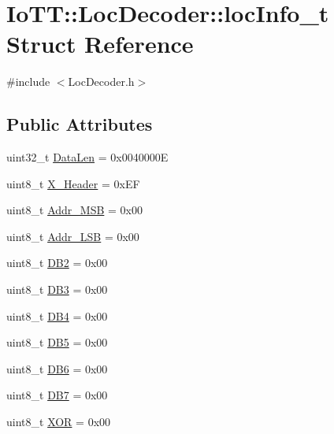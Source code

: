 \hypertarget{structIoTT_1_1LocDecoder_1_1locInfo__t}{}\section{Io\+TT\+:\+:Loc\+Decoder\+:\+:loc\+Info\+\_\+t Struct Reference}
\label{structIoTT_1_1LocDecoder_1_1locInfo__t}


{\ttfamily \#include $<$Loc\+Decoder.\+h$>$}

\subsection*{Public Attributes}
\begin{DoxyCompactItemize}
\item 
uint32\+\_\+t \hyperlink{structIoTT_1_1LocDecoder_1_1locInfo__t_a366f3daff17bd4cb0cb458fda712cb64}{Data\+Len} = 0x0040000E
\item 
uint8\+\_\+t \hyperlink{structIoTT_1_1LocDecoder_1_1locInfo__t_aa78eebe97913b8aee31970a397d1a2ea}{X\+\_\+\+Header} = 0x\+EF
\item 
uint8\+\_\+t \hyperlink{structIoTT_1_1LocDecoder_1_1locInfo__t_a1c7419ff7e49e06d643a6f2aee7094d1}{Addr\+\_\+\+M\+SB} = 0x00
\item 
uint8\+\_\+t \hyperlink{structIoTT_1_1LocDecoder_1_1locInfo__t_abac342575730426e02563ae3a3ba3e3d}{Addr\+\_\+\+L\+SB} = 0x00
\item 
uint8\+\_\+t \hyperlink{structIoTT_1_1LocDecoder_1_1locInfo__t_aa43dab417ff4feeaa85f4ef38d35f888}{D\+B2} = 0x00
\item 
uint8\+\_\+t \hyperlink{structIoTT_1_1LocDecoder_1_1locInfo__t_a66a7279b1e223bf966139127debdb7ee}{D\+B3} = 0x00
\item 
uint8\+\_\+t \hyperlink{structIoTT_1_1LocDecoder_1_1locInfo__t_ab6ae0249645f406dbe74c90055134b94}{D\+B4} = 0x00
\item 
uint8\+\_\+t \hyperlink{structIoTT_1_1LocDecoder_1_1locInfo__t_a6dcc29e90e186cdf681454bca48a4a59}{D\+B5} = 0x00
\item 
uint8\+\_\+t \hyperlink{structIoTT_1_1LocDecoder_1_1locInfo__t_a500934dde326dc7cd5a083cce1909356}{D\+B6} = 0x00
\item 
uint8\+\_\+t \hyperlink{structIoTT_1_1LocDecoder_1_1locInfo__t_a9c189efe14e6470b4a964d64f089c16d}{D\+B7} = 0x00
\item 
uint8\+\_\+t \hyperlink{structIoTT_1_1LocDecoder_1_1locInfo__t_a9a3712edbdce8c37415f22683fdd51f3}{X\+OR} = 0x00
\end{DoxyCompactItemize}


